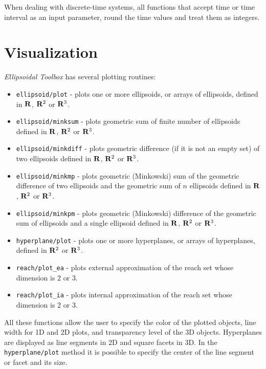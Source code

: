 When dealing with discrete-time systems, all functions that accept time or
time interval as an input parameter, round the time values and treat them as
integers.



\section{Visualization}
{\it Ellipsoidal Toolbox} has several plotting routines:
\begin{itemize}
\item {\tt ellipsoid/plot} - plots one or more ellipsoids, or arrays of
ellipsoids, defined in ${\bf R}$, ${\bf R}^2$ or ${\bf R}^3$.
\item {\tt ellipsoid/minksum} - plots geometric sum of finite number of
ellipsoids defined in ${\bf R}$, ${\bf R}^2$ or ${\bf R}^3$.
\item {\tt ellipsoid/minkdiff} - plots geometric difference
(if it is not an empty set) of two ellipsoids defined in
${\bf R}$, ${\bf R}^2$ or ${\bf R}^3$.
\item {\tt ellipsoid/minkmp} - plots geometric (Minkowski) sum
of the geometric difference of two ellipsoids and the geometric sum of $n$
ellipsoids defined in ${\bf R}$, ${\bf R}^2$ or ${\bf R}^3$.
\item {\tt ellipsoid/minkpm} - plots geometric (Minkowski) difference of the
geometric sum of ellipsoids and a single ellipsoid defined in
${\bf R}$, ${\bf R}^2$ or ${\bf R}^3$.
\item {\tt hyperplane/plot} - plots one or more hyperplanes, or arrays of
hyperplanes, defined in ${\bf R}^2$ or ${\bf R}^3$.
\item {\tt reach/plot\_ea} - plots external approximation of the reach set
whose dimension is $2$ or $3$.
\item {\tt reach/plot\_ia} - plots internal approximation of the reach set
whose dimension is $2$ or $3$.
\end{itemize}
All these functions allow the user to specify the color of the plotted objects,
line width for 1D and 2D plots, and transparency level of the 3D objects.
Hyperplanes are displayed as line segments in 2D and square facets in 3D.
In the {\tt hyperplane/plot} method it is possible to specify the center
of the line segment or facet and its size.

